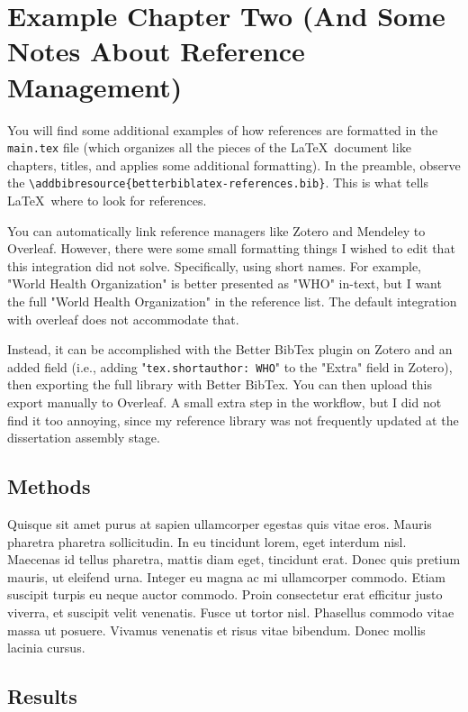 \chapter{Example Chapter Two (And Some Notes About Reference Management)}

\noindent You will find some additional examples of how references are formatted in the \texttt{main.tex} file (which organizes all the pieces of the \LaTeX~document like chapters, titles, and applies some additional formatting). In the preamble, observe the \texttt{\textbackslash addbibresource\{betterbiblatex-references.bib\}}. This is what tells \LaTeX~where to look for references. 

You can automatically link reference managers like Zotero and Mendeley to Overleaf. However, there were some small formatting things I wished to edit that this integration did not solve. Specifically, using short names. For example, "World Health Organization" is better presented as "WHO" in-text, but I want the full "World Health Organization" in the reference list. The default integration with overleaf does not accommodate that.

Instead, it can be accomplished with the Better BibTex plugin on Zotero and an added field (i.e., adding "\texttt{tex.shortauthor: WHO}" to the "Extra" field in Zotero), then exporting the full library with Better BibTex. You can then upload this export manually to Overleaf. A small extra step in the workflow, but I did not find it too annoying, since my reference library was not frequently updated at the dissertation assembly stage.

\section{Methods}

Quisque sit amet purus at sapien ullamcorper egestas quis vitae eros. Mauris pharetra pharetra sollicitudin. In eu tincidunt lorem, eget interdum nisl. Maecenas id tellus pharetra, mattis diam eget, tincidunt erat. Donec quis pretium mauris, ut eleifend urna. Integer eu magna ac mi ullamcorper commodo. Etiam suscipit turpis eu neque auctor commodo. Proin consectetur erat efficitur justo viverra, et suscipit velit venenatis. Fusce ut tortor nisl. Phasellus commodo vitae massa ut posuere. Vivamus venenatis et risus vitae bibendum. Donec mollis lacinia cursus. 

\section{Results}

